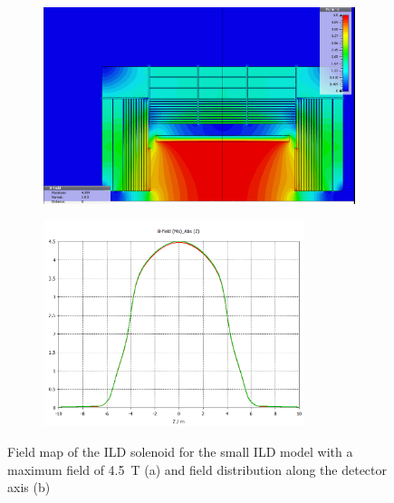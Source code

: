 \begin{figure}[t]
\begin{center}
\begin{subfigure}{0.9\hsize} \includegraphics[width=\textwidth]{Integration/fig/field_small_4_5.png}
\caption{ \label{ild:fig:magnet_small_map}}
 \end{subfigure}
\hspace{0.03\textwidth}
\begin{subfigure}{0.9\hsize} \includegraphics[width=\textwidth, height = 6cm]{Integration/fig/field_small_4_5_plot.png}
\caption{  \label{ild:fig:magnet_small_field}}
 \end{subfigure}
\end{center}
\caption{Field map of the ILD solenoid for the small ILD model with a maximum field of 4.5~T (a) and field distribution along the detector axis (b)~\cite{ild:bib:Magnet_Simulations}}
\label{ILD:fig:magnet_small}
\end{figure}



